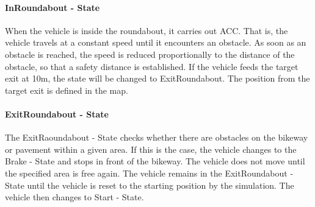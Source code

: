 \documentclass[11pt,oneside,openright]{mpreport}
\begin{document}
\paragraph{InRoundabout - State}
When the vehicle is inside the roundabout, it carries out \ac {ACC}. That is, the vehicle travels at a constant speed until it encounters an obstacle. 
As soon as an obstacle is reached, the speed is reduced proportionally to the distance of the obstacle, so that a safety distance is established.
If the vehicle feeds the target exit at 10m, the state will be changed to ExitRoundabout. The position from the target exit is defined in the map.




\paragraph{ExitRoundabout - State}

The ExitRaoundabout - State checks whether there are obstacles on the bikeway or pavement within a given area.
If this is the case, the vehicle changes to the Brake - State and stops in front of the bikeway. The vehicle does not move until the specified area is free again.
The vehicle remains in the ExitRoundabout - State until the vehicle is reset to the starting position by the simulation.
The vehicle then changes to Start - State.
\end{document}
